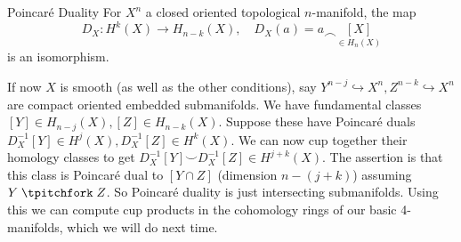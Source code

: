      \begin{namedthm}{Poincar\'e Duality} 
       For $X^n $ a closed oriented topological $n$-manifold, the map   \[
           D_X \colon H^k(X ) \to H_{n-k} (X), \quad D_X(a) = a \frown \underset{\in H_n (X)}{[X]} 
       \] is an isomorphism.
    \end{namedthm}
    If now $X$ is smooth (as well as the other conditions), say $Y^{n-j} \hookrightarrow X^n , Z^{n-k} \hookrightarrow X^n  $ are compact oriented embedded submanifolds. We have fundamental classes $[Y] \in H_{n-j}(X), [Z] \in H_{n-k}(X)$. Suppose these have Poincar\'e duals $D^{-1} _X [Y] \in  H^j (X), D^{-1}_X[Z ] \in H^k (X)$. We can now cup together their homology classes to get $D^{-1}_X [Y] \smile D^{-1}_X [Z] \in H^{j+k}(X)$. The assertion is that this class is Poincar\'e dual to $[Y \cap  Z]$ (dimension $n-(j+k)$) assuming $Y \transv Z$. So Poincar\'e duality is just intersecting submanifolds. Using this we can compute cup products in the cohomology rings of our basic 4-manifolds, which we will do next time.


